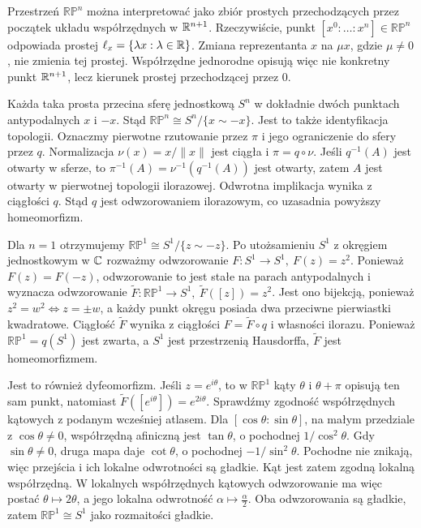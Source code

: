 \begin{uwaga}
Przestrzeń $\mathbb{RP}^n$ można interpretować jako zbiór prostych
przechodzących przez początek układu współrzędnych w $\mathbb{R}^{n+1}$.
Rzeczywiście, punkt $[x^0:\dots:x^n]\in\mathbb{RP}^n$
odpowiada prostej $\ell_x=\{\lambda x:\lambda\in\mathbb{R}\}$.
Zmiana reprezentanta $x$ na $\mu x$, gdzie $\mu\neq0$, nie zmienia tej
prostej. Współrzędne jednorodne opisują więc nie konkretny punkt
$\mathbb{R}^{n+1}$, lecz kierunek prostej przechodzącej przez $0$.

Każda taka prosta przecina sferę jednostkową $S^n$ w dokładnie dwóch
punktach antypodalnych $x$ i $-x$. Stąd $\mathbb{RP}^n\cong S^n/\{x\sim-x\}$.
Jest to także identyfikacja topologii. Oznaczmy pierwotne rzutowanie
przez $\pi$ i jego ograniczenie do sfery przez $q$.
Normalizacja $\nu(x)=x/\|x\|$ jest ciągła i $\pi=q\circ\nu$.
Jeśli $q^{-1}(A)$ jest otwarty w sferze, to
$\pi^{-1}(A)=\nu^{-1}(q^{-1}(A))$ jest otwarty, zatem $A$ jest
otwarty w pierwotnej topologii ilorazowej. Odwrotna implikacja
wynika z ciągłości $q$. Stąd $q$ jest odwzorowaniem ilorazowym,
co uzasadnia powyższy homeomorfizm.

Dla $n=1$ otrzymujemy $\mathbb{RP}^1\cong S^1/\{z\sim-z\}$.
Po utożsamieniu $S^1$ z okręgiem jednostkowym w $\mathbb{C}$ rozważmy
odwzorowanie $F:S^1\to S^1,\ F(z)=z^2$.
Ponieważ $F(z)=F(-z)$,
odwzorowanie to jest stałe na parach antypodalnych i wyznacza
odwzorowanie $\widetilde F:\mathbb{RP}^1\to S^1, \ \widetilde F([z])=z^2$.
Jest ono bijekcją, ponieważ $z^2=w^2 \iff z=\pm w$,
a każdy punkt okręgu posiada dwa przeciwne pierwiastki kwadratowe.
Ciągłość $\widetilde F$ wynika z ciągłości $F=\widetilde F\circ q$
i własności ilorazu. Ponieważ $\mathbb{RP}^1=q(S^1)$ jest zwarta,
a $S^1$ jest przestrzenią Hausdorffa, $\widetilde F$ jest homeomorfizmem.

Jest to również dyfeomorfizm. Jeśli $z=e^{i\theta}$,
to w $\mathbb{RP}^1$ kąty $\theta$ i $\theta+\pi$ opisują ten sam punkt,
natomiast $\widetilde F([e^{i\theta}])=e^{2i\theta}$.
Sprawdźmy zgodność współrzędnych kątowych z podanym wcześniej atlasem.
Dla $[\cos\theta:\sin\theta]$, na małym przedziale z $\cos\theta\ne0$,
współrzędną afiniczną jest $\tan\theta$, o pochodnej $1/\cos^2\theta$.
Gdy $\sin\theta\ne0$, druga mapa daje $\cot\theta$, o pochodnej
$-1/\sin^2\theta$. Pochodne nie znikają, więc przejścia i ich lokalne
odwrotności są gładkie. Kąt jest zatem zgodną lokalną współrzędną.
W lokalnych współrzędnych kątowych odwzorowanie ma więc postać $\theta\longmapsto 2\theta$,
a jego lokalna odwrotność $\alpha\longmapsto \frac{\alpha}{2}$.
Oba odwzorowania są gładkie, zatem $\mathbb{RP}^1\cong S^1$
jako rozmaitości gładkie.


\end{uwaga}
